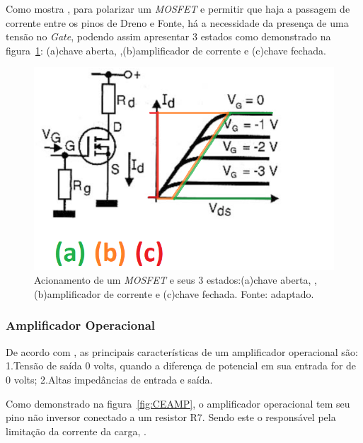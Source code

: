 Como mostra , para polarizar um \textit{MOSFET} e permitir que haja a passagem de corrente entre os pinos de Dreno e Fonte, há a necessidade da presença de uma tensão no \textit{Gate}, podendo assim apresentar 3 estados como demonstrado na figura~\ref{fig:MOSFET3}: (a)chave aberta, ,(b)amplificador  de corrente e (c)chave fechada.

\FloatBarrier
\begin{figure}[!htbp]
	\centering
	\includegraphics[scale=0.5]{imagens/MOSFET3}
	\caption{Acionamento de um \textit{MOSFET} e seus 3 estados:(a)chave aberta, ,(b)amplificador  de corrente e (c)chave fechada. Fonte:  adaptado.}
	\label{fig:MOSFET3}
\end{figure}
\FloatBarrier

\subsubsection{Amplificador Operacional}

De acordo com , as principais características de um amplificador operacional são: 1.Tensão de saída 0 volts, quando a diferença de potencial em sua entrada for de 0 volts; 2.Altas impedâncias de entrada e saída.

Como demonstrado na figura~\ref{fig:CEAMP}, o amplificador operacional tem seu pino não inversor conectado a um resistor R7. Sendo este o responsável pela limitação da corrente da carga, \cite{ART2885}.

